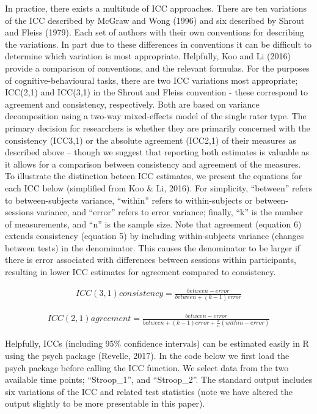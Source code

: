 \documentclass[english,,man,floatsintext]{apa6}
\begin{document}
In practice, there exists a multitude of ICC approaches. There are ten variations of the ICC described by McGraw and Wong (1996) and six described by Shrout and Fleiss (1979). Each set of authors with their own conventions for describing the variations. In part due to these differences in conventions it can be difficult to determine which variation is most appropriate. Helpfully, Koo and Li (2016) provide a comparison of conventions, and the relevant formulas. For the purposes of cognitive-behavioural tasks, there are two ICC variations most appropriate; ICC(2,1) and ICC(3,1) in the Shrout and Fleiss convention - these correspond to agreement and consistency, respectively. Both are based on variance decomposition using a two-way mixed-effects model of the single rater type. The primary decision for researchers is whether they are primarily concerned with the consistency (ICC3,1) or the absolute agreement (ICC2,1) of their measures as described above -- though we suggest that reporting both estimates is valuable as it allows for a comparison between consistency and agreement of the measures. To illustrate the distinction beteen ICC estimates, we present the equations for each ICC below (simplified from Koo \& Li, 2016). For simplicity, \enquote{between} refers to between-subjects variance, \enquote{within} refers to within-subjects or between-sessions variance, and \enquote{error} refers to error variance; finally, \enquote{k} is the number of measurements, and \enquote{n} is the sample size. Note that agreement (equation 6) extends consistency (equation 5) by including within-subjects variance (changes between tests) in the denominator. This causes the denominator to be larger if there is error associated with differences between sessions within participants, resulting in lower ICC estimates for agreement compared to consistency.

\begin{align}
ICC(3,1) consistency=\frac{between - error}{between + (k-1)error}
\end{align}

\begin{align}
ICC(2,1) agreement=\frac{between - error}{between + (k-1)error + \frac{k}{n}(within - error)}
\end{align}

Helpfully, ICCs (including 95\% confidence intervals) can be estimated easily in R using the psych package (Revelle, 2017). In the code below we first load the psych package before calling the ICC function. We select data from the two available time points; \enquote{Stroop\_1}, and \enquote{Stroop\_2}. The standard output includes six variations of the ICC and related test statistics (note we have altered the output slightly to be more presentable in this paper).
\end{document}
